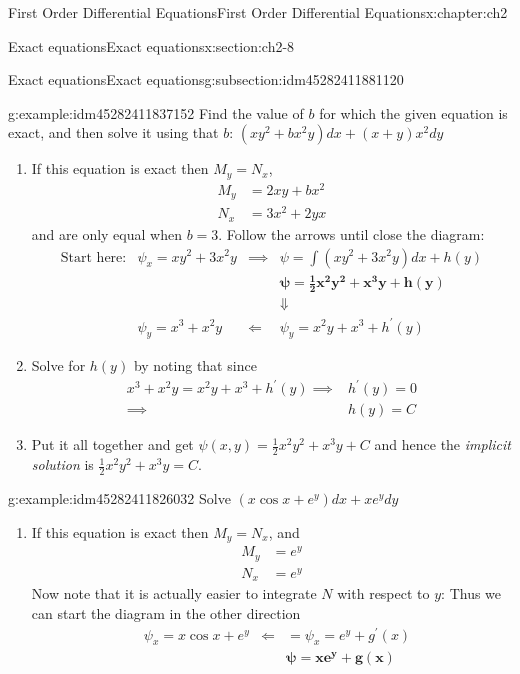 \documentclass[oneside,10pt,]{book}
\numberwithin{equation}{section}
\numberwithin{equation}{section}
\newcommand{\amp}{&}
\begin{document}
\begin{chapterptx}{First Order Differential Equations}{}{First Order Differential Equations}{}{}{x:chapter:ch2}
\begin{sectionptx}{Exact equations}{}{Exact equations}{}{}{x:section:ch2-8}
\begin{subsectionptx}{Exact equations}{}{Exact equations}{}{}{g:subsection:idm45282411881120}
\begin{example}{}{g:example:idm45282411837152}
Find the value of \(b\) for which the given equation is exact, and then solve it using that \(b\): \(\left(xy^{2}+bx^{2}y\right)dx+\left(x+y\right)x^{2}dy\)%
\begin{enumerate}
\item{}If this equation is exact then \(M_{y}=N_{x}\),%
\begin{align*}
M_{y} \amp =2xy+bx^{2}\\
N_{x} \amp =3x^{2}+2yx
\end{align*}
and are only equal when \(b=3\). Follow the arrows until close the diagram:%
\begin{align*}
\text{Start here:} \amp \psi_{x}=xy^{2}+3x^{2}y \amp \implies \amp \psi=\int\left(xy^{2}+3x^{2}y\right)dx+h(y)\\
\amp  \amp  \amp \boldsymbol{\psi=\frac{1}{2}x^{2}y^{2}+x^{3}y+h(y)}\\
\amp  \amp  \amp \Downarrow\\
\amp \psi_{y}=x^{3}+x^{2}y \amp \Longleftarrow \amp \psi_{y}=x^{2}y+x^{3}+h^{\prime}(y)
\end{align*}
%
\item{}Solve for \(h(y)\) by noting that since%
\begin{align*}
x^{3}+x^{2}y=x^{2}y+x^{3}+h^{\prime}(y)\implies \amp h^{\prime}(y)=0\\
\implies \amp h(y)=C
\end{align*}
%
\item{}Put it all together and get \(\psi(x,y)=\frac{1}{2}x^{2}y^{2}+x^{3}y+C\) and hence the \emph{implicit solution} is \(\frac{1}{2}x^{2}y^{2}+x^{3}y=C.\)%
\end{enumerate}
\end{example}
\begin{example}{}{g:example:idm45282411826032}%
Solve \(\left(x\cos x+e^{y}\right)dx+xe^{y}dy\)%
%
\begin{enumerate}
\item{}If this equation is exact then \(M_{y}=N_{x}\), and%
\begin{align*}
M_{y} \amp =e^{y}\\
N_{x} \amp =e^{y}
\end{align*}
Now note that it is actually easier to integrate \(N\) with respect to \(y\): Thus we can start the diagram in the other direction%
\begin{align*}
\amp \psi_{x}=x\cos x+e^{y} \amp \Longleftarrow \amp =\psi_{x}=e^{y}+g^{\prime}(x)\\
\amp  \amp  \amp \boldsymbol{\psi=xe^{y}+g(x)}\\

\end{align*}
\end{enumerate}
\end{example}
\end{subsectionptx}
\end{sectionptx}
\end{chapterptx}
\end{document}
